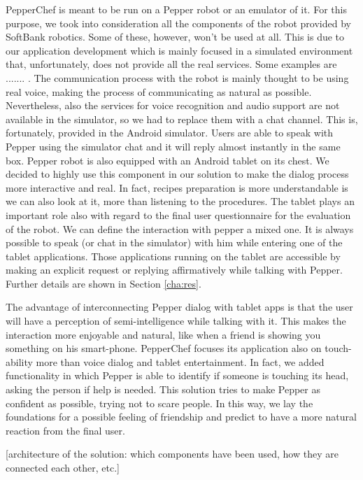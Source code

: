\documentclass[11pt]{article}
\begin{document}
PepperChef is meant to be run on a Pepper robot or an emulator of it. For this purpose, we took into consideration all the components of the robot provided by SoftBank robotics. Some of these, however, won't be used at all. This is due to our application development which is mainly focused in a simulated environment that, unfortunately, does not provide all the real services. Some examples are ....... . The communication process with the robot is mainly thought to be using real voice, making the process of communicating as natural as possible. Nevertheless, also the services for voice recognition and audio support are not available in the simulator, so we had to replace them with a chat channel. This is, fortunately, provided in the Android simulator. Users are able to speak with Pepper using the simulator chat and it will reply almost instantly in the same box. Pepper robot is also equipped with an Android tablet on its chest. We decided to highly use this component in our solution to make the dialog process more interactive and real. In fact, recipes preparation is more understandable is we can also look at it, more than listening to the procedures. The tablet plays an important role also with regard to the final user questionnaire for the evaluation of the robot. We can define the interaction with pepper a mixed one. It is always possible to speak (or chat in the simulator) with him while entering one of the tablet applications. Those applications running on the tablet are accessible by making an explicit request or replying affirmatively while talking with Pepper. Further details are shown in Section \ref{cha:res}. 

The advantage of interconnecting Pepper dialog with tablet apps is that the user will have a perception of semi-intelligence while talking with it. This makes the interaction more enjoyable and natural, like when a friend is showing you something on his smart-phone. PepperChef focuses its application also on touch-ability more than voice dialog and tablet entertainment. In fact, we added functionality in which Pepper is able to identify if someone is touching its head, asking the person if help is needed. This solution tries to make Pepper as confident as possible, trying not to scare people. In this way, we lay the foundations for a possible feeling of friendship and predict to have a more natural reaction from the final user.


[architecture of the solution: which components have been used, how they are connected each other, etc.]
\end{document}
